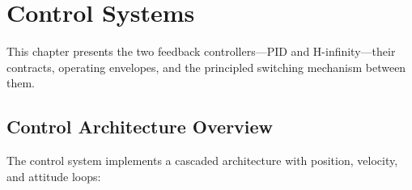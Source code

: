 
\chapter{Control Systems}
\label{ch:control}

This chapter presents the two feedback controllers---PID and H-infinity---their contracts, operating envelopes, and the principled switching mechanism between them.

\section{Control Architecture Overview}

The control system implements a cascaded architecture with position, velocity, and attitude loops:

